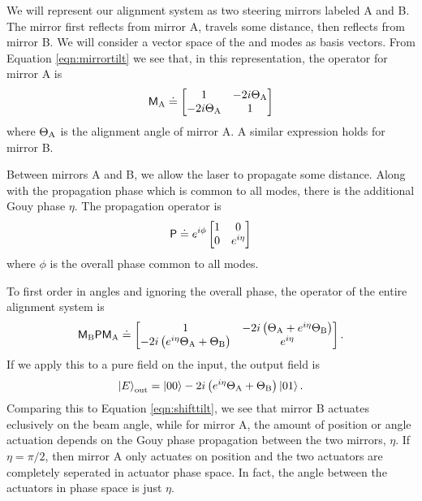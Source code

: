 We will represent our alignment system as two steering mirrors labeled A and B. %
The mirror first reflects from mirror A, travels some distance, then reflects from mirror B. %
We will consider a vector space of the  and  modes as basis vectors. %
From Equation \ref{eqn:mirrortilt} we see that, in this representation, the operator for mirror A is
\begin{equation}
\mathsf{M}_{\rm A} \doteq \left[\begin{matrix} 1 &-2i\Theta_{\rm A}\\-2i\Theta_{\rm A} & 1\end{matrix}\right]
\end{equation}
where $\Theta_{\rm A}$ is the alignment angle of mirror A. %
A similar expression holds for mirror B.

Between mirrors A and B, we allow the laser to propagate some distance. %
Along with the propagation phase which is common to all modes, there is the additional Gouy phase $\eta$. %
The propagation operator is
\begin{equation}
\mathsf{P}\doteq e^{i\phi}\left[\begin{matrix} 1&0\\0&e^{i\eta}\end{matrix}\right]
\end{equation}
where $\phi$ is the overall phase common to all modes.

To first order in angles and ignoring the overall phase, the operator of the entire alignment system is
\begin{equation}
\mathsf{M}_{\rm B}\mathsf{P}\mathsf{M}_{\rm A}\doteq
\left[\begin{matrix} 1 & -2i\left(\Theta_{\rm A}+e^{i\eta}\Theta_{\rm B}\right)\\
-2i\left(e^{i\eta}\Theta_{\rm A}+\Theta_{\rm B}\right) & e^{i\eta} \end{matrix}\right].
\end{equation}
If we apply this to a pure  field on the input, the output field is
\begin{equation}
\left| E \right>_{\rm{out}}=\left| 00 \right>-2i\left(e^{i\eta}\Theta_{\rm A}+\Theta_{\rm B}\right)\left| 01 \right>.
\end{equation}
Comparing this to Equation \ref{eqn:shifttilt}, we see that mirror B actuates eclusively on the beam angle, while for mirror A, the amount of position or angle actuation depends on the Gouy phase propagation between the two mirrors, $\eta$. %
If $\eta=\pi/2$, then mirror A only actuates on position and the two actuators are completely seperated in actuator phase space. %
In fact, the angle between the actuators in phase space is just $\eta$.

